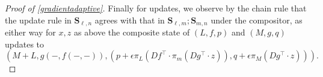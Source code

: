 \documentclass[11pt, one side, article]{memoir}
\theoremstyle{definition}
\theoremstyle{plain}
\newcommand{\Cat}[1]{\mathbf{#1}}%
\newcommand{\0}{\textsf{0}}
\newcommand{\1}{\tn{\textsf{1}}}
\renewcommand{\S}{{\Cat{S}}}
\begin{document}
\begin{proof}[Proof of \cref{gradientadaptive}]
Finally for updates, we observe by the chain rule that the update rule in $\S_{\ell,n}$ agrees with that in $\S_{\ell,m};\S_{m,n}$ under the compositor, as either way for $x,z$ as above the composite state of $(L,f,p)$ and $(M,g,q)$ updates to 
$$\left( M+L,g(-,f(-,-)),\left( p + \epsilon \pi_L (Df^\top \cdot \pi_m(Dg^\top \cdot z)),q + \epsilon \pi_M(Dg^\top \cdot z) \right) \right).$$
\end{proof}


\printbibliography 
\end{document}
